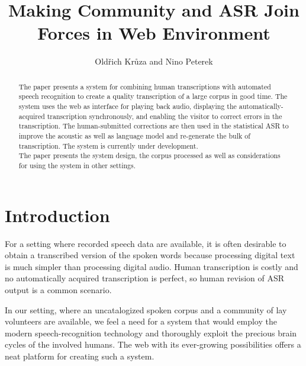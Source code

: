 \documentclass{llncs}
\begin{document}
\newtheorem{Definition}{Definition}
\title{Making Community and ASR Join Forces in Web Environment}

\author{Old\v{r}ich Krůza and Nino Peterek}

\maketitle

\begin{abstract}

The paper presents a system for combining human transcriptions with automated
speech recognition to create a quality transcription of a large corpus in good
time. The system uses the web as interface for playing back audio, displaying
the automatically-acquired transcription synchronously, and enabling the visitor
to correct errors in the transcription. The human-submitted corrections are then
used in the statistical ASR to improve the acoustic as well as language model
and re-generate the bulk of transcription. The system is currently under
development.\\
The paper presents the system design, the corpus processed as well as
considerations for using the system in other settings.

\end{abstract}

\section{Introduction}

For a setting where recorded speech data are available, it is often desirable to
obtain a transcribed version of the spoken words because processing digital text
is much simpler than processing digital audio. Human transcription is costly and
no automatically acquired transcription is perfect, so human revision of ASR
output is a common scenario.

In our setting, where an uncatalogized spoken corpus and a community of lay
volunteers are available, we feel a need for a system that would employ the
modern speech-recognition technology and thoroughly exploit the precious brain
cycles of the involved humans. The web with its ever-growing possibilities
offers a neat platform for creating such a system.
\end{document}
